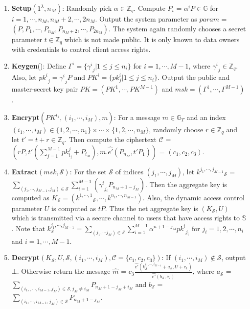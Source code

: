 \begin{enumerate}
 \item \textbf{Setup}$(1^{\lambda},n_M)$: Randomly pick $\alpha \in \mathbb{Z}_q$. Compute $P_i$ = ${\alpha^{i}}P \in \mathbb{G}$ for $i = 1,\cdots,n_M,n_M+2,\cdots,2n_M$. Output the system parameter as $param$ = $(P,P_1,\cdots,P_{n_M},P_{n_M+2},\cdots,P_{2n_M})$. The system again randomly chooses a secret parameter $t \in \mathbb{Z}_q$ which is not made public. It is only known to data owners with credentials to control client access rights.
 
 \item \textbf{Keygen}(): Define $\Gamma^{i}=\{{\gamma^{i}}_j|1\leq j \leq n_i\}$ for $i=1,\cdots,M-1$, where ${\gamma^{i}}_j \in \mathbb{Z}_q$. Also, let ${pk^{i}}_j={\gamma^{i}}_jP$ and $PK^{i}=\{pk^{i}_j|1\leq j \leq n_i\}$. Output the public and master-secret key pair $PK=(PK^{1},\cdots,PK^{M-1})$ and $msk=(\Gamma^{1},\cdots,\Gamma^{M-1})$.
 
 \item \textbf{Encrypt}$(PK^{i_1},(i_1,\cdots,i_M),m)$: For a message $m \in \mathbb{G}_T$ and an index $(i_1,\cdots,i_M) \in \{1,2,\cdots,n_1\}\times\cdots\times\{1,2,\cdots,n_M\}$, randomly choose $r\in\mathbb{Z}_q$ and let $t'=t+r \in\mathbb{Z}_q$. Then compute the ciphertext $\mathcal{C}$ = $(rP,t'{(\sum_{j=1}^{M-1}pk^{j}_{i_j}+P_{i_M})},m.\hat{e'}(P_{n_M},t'P_1))$ = $(c_1,c_2,c_3)$.
 
 \item \textbf{Extract}$(msk,\mathcal{S})$: For the set $\mathcal{S}$ of indices $(j_1,\cdots,j_M)$, let ${k^{j_1,\cdots,j_{M-1}}}_{\mathcal{S}}$ = $\sum_{(j_1,\cdots,j_{M-1},j_M)\in \mathcal{S}}\sum_{i=1}^{M-1}({\gamma^{i}}_{j_i}P_{n_M+1-j_{M}})$. Then the aggregate key is computed as $K_{\mathcal{S}}=({k^{1,\cdots,1}}_{\mathcal{S}},\cdots,k^{n_1,\cdots,n_{M-1}})$. Also, the dynamic access control parameter $U$ is computed as $tP$. Thus the net aggregate key is $(K_{\mathcal{S}},U)$ which is transmitted via a secure channel to users that have access rights to $\mathbb{S}$. Note that  $k^{j_1,\cdots,j_{M-1}}_{\mathcal{S}}=\sum_{(j_1,\cdots j_M)\in\mathcal{S}}\sum_{i=1}^{M-1}\alpha^{n+1-j_M}{pk^{i}}_{j_i}$ for $j_i=1,2,\cdots,n_i$ and $i=1,\cdots,M-1$. 
 
 \item \textbf{Decrypt}$(K_{\mathcal{S}}, U, \mathcal{S},(i_1,\cdots,i_M),\mathcal{C}=\{c_1,c_2,c_3\})$: If $(i_1,\cdots,i_M)\notin\mathcal{S}$, output $\bot$. Otherwise return the message $\hat{m}$ = $c_3\frac{\hat{e'}(k^{i_1,\cdots,i_{M-1}}_{\mathcal{S}}+a_{\mathcal{S}},U+c_1)}{\hat{e'}(b_{\mathcal{S}},c_2)}$, where $a_{\mathcal{S}}$ = $\sum_{(i_1,,\cdots,i_{M-1},j_M)\in\mathcal{S},j_M\neq i_M}P_{n_M+1-j_M+i_M}$ and $b_{\mathcal{S}}$ = $\sum_{(i_1,\cdots,i_{M-1},j_M)\in\mathcal{S}}P_{n_M+1-j_M}$.
 
 
\end{enumerate}


